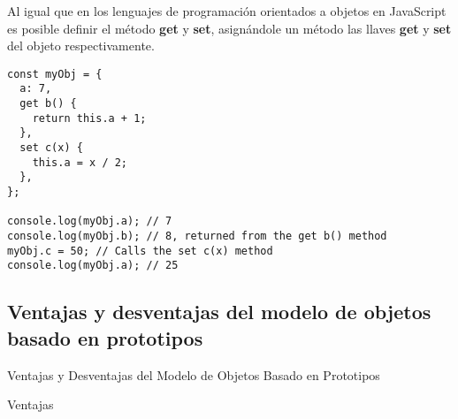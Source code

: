 \documentclass{article}
\begin{document}
Al igual que en los lenguajes de programación orientados a objetos en JavaScript es posible definir
el método \textbf{get} y \textbf{set}, asignándole un método las llaves \textbf{get} y \textbf{set}
del objeto respectivamente.

\begin{lstlisting}
const myObj = {
  a: 7,
  get b() {
    return this.a + 1;
  },
  set c(x) {
    this.a = x / 2;
  },
};

console.log(myObj.a); // 7
console.log(myObj.b); // 8, returned from the get b() method
myObj.c = 50; // Calls the set c(x) method
console.log(myObj.a); // 25
\end{lstlisting}

\subsection{Ventajas y desventajas del modelo de objetos basado en prototipos }

Ventajas y Desventajas del Modelo de Objetos Basado en Prototipos

Ventajas
\end{document}
